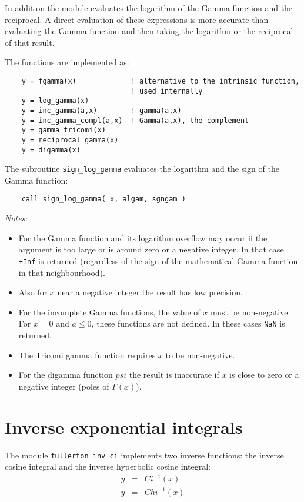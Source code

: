 \documentclass{article}
\begin{document}
In addition the module evaluates the logarithm of the Gamma function and the reciprocal. A direct evaluation
of these expressions is more accurate than evaluating the Gamma function and then taking the logarithm or the reciprocal
of that result.

The functions are implemented as:
\begin{verbatim}
    y = fgamma(x)             ! alternative to the intrinsic function,
                              ! used internally
    y = log_gamma(x)
    y = inc_gamma(a,x)        ! gamma(a,x)
    y = inc_gamma_compl(a,x)  ! Gamma(a,x), the complement
    y = gamma_tricomi(x)
    y = reciprocal_gamma(x)
    y = digamma(x)
\end{verbatim}

The subroutine \verb+sign_log_gamma+ evaluates the logarithm and the sign of the Gamma function:
\begin{verbatim}
    call sign_log_gamma( x, algam, sgngam )
\end{verbatim}

\emph{Notes:}
\begin{itemize}
\item
For the Gamma function and its logarithm overflow may occur if the argument is too large or is around zero or a negative integer.
In that case \verb~+Inf~ is returned (regardless of the sign of the mathematical Gamma function in that neighbourhood).
\item
Also for $x$ near a negative integer the result has low precision.
\item
For the incomplete Gamma functions, the value of $x$ must be non-negative. For $x = 0$ and $a \leq 0$, these functions are
not defined. In these cases \verb+NaN+ is returned.
\item
The Tricomi gamma function requires $x$ to be non-negative.
\item
For the digamma function $psi$ the result is inaccurate if $x$ is close to zero or a negative integer (poles of $\Gamma(x)$).
\end{itemize}


\section{Inverse exponential integrals}
The module \verb+fullerton_inv_ci+ implements two inverse functions: the inverse cosine integral
and the inverse hyperbolic cosine integral:
\begin{eqnarray}
    y &=& Ci^{-1}(x) \\
    y &=& Chi^{-1}(x)
\end{eqnarray}
\end{document}
